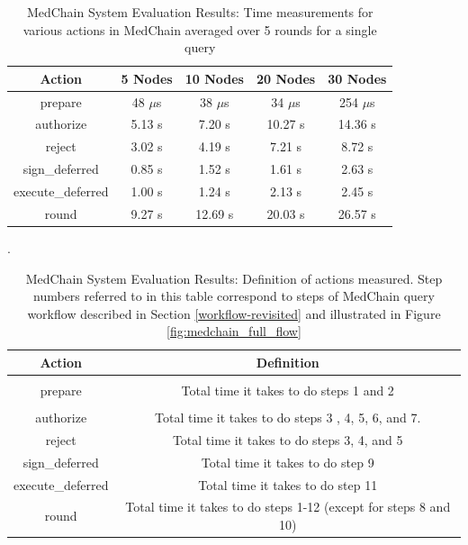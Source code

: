\begin{table}[ht]
\centering
\caption{MedChain System Evaluation Results: Time measurements for various actions in MedChain averaged over 5 rounds for a single query}
\label{tbl:sim-res}
\begin{tabular}{|c|c|c|c|c|}
\hline
\textbf{Action} & \textbf{5 Nodes} & \textbf{10 Nodes} & \textbf{20 Nodes} & \textbf{30 Nodes}\\
\hline
prepare  & 48 $\mu$s & 38 $\mu$s & 34 $\mu$s & 254 $\mu$s \\ 
\hline
authorize  &5.13 s  & 7.20 s & 10.27 s & 14.36 s\\ 
\hline
reject & 3.02 s & 4.19 s & 7.21 s& 8.72 s\\ 
\hline
sign\_deferred & 0.85 s  &  1.52 s &  1.61 s & 2.63 s\\
\hline
execute\_deferred & 1.00 s & 1.24 s & 2.13 s & 2.45 s\\
\hline
round &  9.27 s & 12.69 s & 20.03 s& 26.57 s\\
\hline
\end{tabular}
\end{table}

\begin{table}[ht]
\centering
\caption{MedChain System Evaluation Results: Definition of actions measured. Step numbers referred to in this table correspond to steps of MedChain query workflow described in Section \ref{workflow-revisited} and illustrated in Figure \ref{fig:medchain_full_flow}}.
\label{tbl:sim-actions}
\begin{tabular}{|c|c|}
\hline
\textbf{Action} & \textbf{Definition}\\
\hline
\\[-1em]
prepare  &   \pbox{20cm}{Total time it takes to do steps 1 and 2\\[1pt]}\\ 
\hline
\\[-1em]
authorize   &   \pbox{20cm}{Total time it takes to do steps 3 , 4, 5, 6, and 7.\\[1pt]} \\ 
\hline
reject  &  Total time it takes to do steps 3, 4, and 5\\ 
\hline
sign\_deferred &  Total time it takes to do step 9   \\
\hline
execute\_deferred &  Total time it takes to do step 11 \\
\hline
round &  Total time it takes to do steps 1-12 (except for steps 8 and 10) \\
\hline
\end{tabular}
\end{table}

